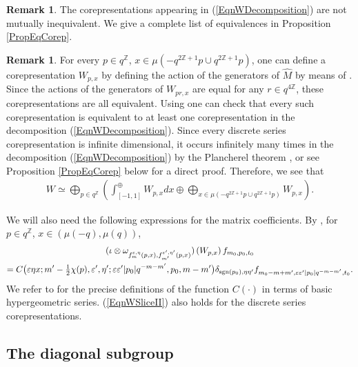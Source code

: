 \documentclass[pdftex]{sigma}
\numberwithin{equation}{section}
\theoremstyle{definition}
\newtheorem{rmk}[thm]{Remark}
\newcommand{\ep}{\varepsilon}
\newcommand{\sgn}{\text{\rm sgn}}
\begin{document}
\begin{rmk}\label{RmkEquiCorep}
The corepresentations appearing in (\ref{EqnWDecomposition}) are not mutually inequivalent. We give a complete list of equivalences in Proposition \ref{PropEqCorep}.
\end{rmk}

\begin{rmk}\label{RmkExtraCorep}
For every $p \in q^{\mathbb{Z}}$, $x \in \mu(-q^{2\mathbb{Z}+1}p \cup q^{2\mathbb{Z}+1}p)$, one can def\/ine a corepresentation $W_{p,x}$ by def\/ining the action of the generators of $\hat{M}$ by means of \cite[Lemma~10.1]{GroKoeKus}. Since the actions of the generators of $W_{pr,x}$ are equal for any  $r \in q^{4\mathbb{Z}}$,   these corepresentations are all equivalent.  Using \cite[Proposition 5.2]{GroKoeKus} one can check that every such corepresentation is equivalent to at least one corepresentation in the decomposition (\ref{EqnWDecomposition}). Since every discrete series corepresentation is inf\/inite dimensional, it occurs inf\/initely many times in the decomposition (\ref{EqnWDecomposition}) by the Plancherel theorem \cite[Theorem 3.4.1]{Des}, or see Proposition \ref{PropEqCorep} below for a direct proof. Therefore, we see that
\begin{gather*}%
W \simeq \bigoplus_{p \in q^\mathbb{Z}} \left( \int_{[-1,1]}^\oplus
W_{p,x} dx \oplus \bigoplus_{x \in \mu(-q^{2\mathbb{Z}+1 }p \cup q^{ 2\mathbb{Z}+1}p)} W_{p,x}
\right).
\end{gather*}
\end{rmk}

We will also need the following expressions for the matrix coef\/f\/icients.
By \cite[Lemma 10.9 and Section 10.3]{GroKoeKus}, for $p \in q^{\mathbb{Z}}$, $x \in (\mu(-q),\mu(q))$,
\begin{gather}\label{EqnWSliceII}
(\iota \otimes \omega_{f^{\ep,\eta}_m(p,x), f^{\ep',\eta'}_{m'}(p,x)})\left(W_{p,x} \right) f_{m_0, p_0, t_0}   \\
= C\big(\ep\eta x;m'-\tfrac{1}{2}\chi(p),\ep',\eta';\ep\ep'\vert p_0\vert q^{-m-m'},p_0,m-m'\big) \delta_{\sgn(p_0),\eta\eta'} f_{m_0 - m + m',\ep\ep' \vert p_0\vert q^{-m-m'} , t_0}. \nonumber
\end{gather}
We refer to \cite{GroKoeKus} for the precise def\/initions of the function  $C(\cdot)$ in terms of basic hypergeometric series. (\ref{EqnWSliceII}) also holds for the discrete series corepresentations.

\subsection*{The diagonal subgroup}
\end{document}
